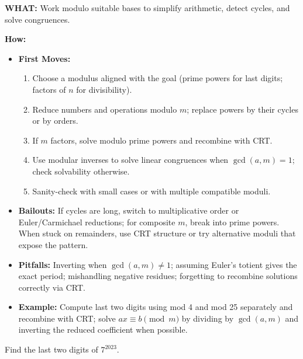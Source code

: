 \documentclass[12pt]{article}
\newenvironment{problem}[1]
{\begin{tcolorbox}[colback=blue!5!white,colframe=blue!75!black,title={#1}]}{\end{tcolorbox}}
\begin{document}
\textbf{WHAT:} Work modulo suitable bases to simplify arithmetic, detect cycles, and solve congruences.


\textbf{How:}
\begin{itemize}
    \item \textbf{First Moves:}
    \begin{enumerate}[nosep]
        \item Choose a modulus aligned with the goal (prime powers for last digits; factors of $n$ for divisibility).
        \item Reduce numbers and operations modulo $m$; replace powers by their cycles or by orders.
        \item If $m$ factors, solve modulo prime powers and recombine with CRT.
        \item Use modular inverses to solve linear congruences when $\gcd(a,m)=1$; check solvability otherwise.
        \item Sanity-check with small cases or with multiple compatible moduli.
    \end{enumerate}
    \item \textbf{Bailouts:} If cycles are long, switch to multiplicative order or Euler/Carmichael reductions; for composite $m$, break into prime powers. When stuck on remainders, use CRT structure or try alternative moduli that expose the pattern.
    \item \textbf{Pitfalls:} Inverting when $\gcd(a,m)\ne 1$; assuming Euler's totient gives the exact period; mishandling negative residues; forgetting to recombine solutions correctly via CRT.
    \item \textbf{Example:} Compute last two digits using mod 4 and mod 25 separately and recombine with CRT; solve $ax\equiv b\pmod m$ by dividing by $\gcd(a,m)$ and inverting the reduced coefficient when possible.
\end{itemize}

\begin{problem}{Example: Large Power Remainder}
Find the last two digits of $7^{2023}$.
\end{problem}
\end{document}
